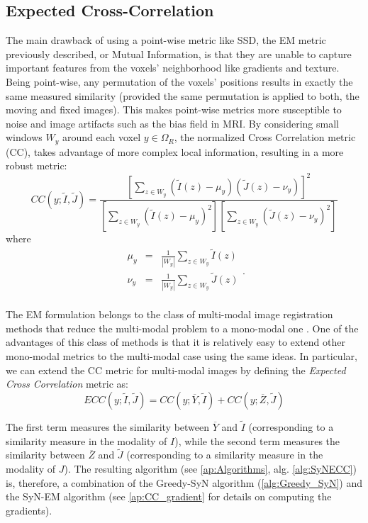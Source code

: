 \subsection{Expected Cross-Correlation}\label{sec:syn_ecc}
The main drawback of using a point-wise metric like SSD, the EM metric previously described, or Mutual Information, is that they are unable to capture important features from the voxels' neighborhood like gradients and texture. Being point-wise, any permutation of the voxels' positions results in exactly the same measured similarity (provided the same permutation is applied to both, the moving and fixed images). This makes point-wise metrics more susceptible to noise and image artifacts such as the bias field in MRI. By considering small windows $W_{y}$ around each voxel $y\in\Omega_{R}$, the normalized Cross Correlation metric (CC), takes advantage of more complex local information, resulting in a more robust metric:
\begin{equation}
    CC(y;\tilde{I}, \tilde{J}) = \frac{\left[\sum_{z\in W_{y}} \left(\tilde{I}(z) - \mu_{y}\right)\left(\tilde{J}(z) - \nu_{y}\right)\right]^{2}}
    {\left[\sum_{z \in W_{y}}\left(\tilde{I}(z) - \mu_{y}\right)^{2}\right] \left[\sum_{z \in W_{y}}\left(\tilde{J}(z) - \nu_{y}\right)^{2}\right]}
\end{equation}
where
\begin{equation}
    \begin{array}{lll}
        \mu_{y} &=& \frac{1}{|W_{y}|}\sum_{z \in W_{y}}\tilde{I}(z)\\
        \nu_{y} &=& \frac{1}{|W_{y}|}\sum_{z \in W_{y}}\tilde{J}(z)\\
    \end{array}.
\end{equation}

The EM formulation belongs to the class of multi-modal image registration methods that reduce the multi-modal problem to a mono-modal one \citep{Sotiras2013}. One of the advantages of this class of methods is that it is relatively easy to extend other mono-modal metrics to the multi-modal case using the same ideas. In particular, we can extend the CC metric for multi-modal images by defining the {\it Expected Cross Correlation} metric as:
\begin{equation}\label{eq:ecc_metric}
    ECC(y;\tilde{I}, \tilde{J}) = CC(y; \overline{Y}, \tilde{I}) + CC(y; \overline{Z}, \tilde{J})
\end{equation}

The first term measures the similarity between $\overline{Y}$ and $\tilde{I}$ (corresponding to a similarity measure in the modality of $I$), while the second term measures the
similarity between $\overline{Z}$ and $\tilde{J}$ (corresponding to a similarity measure in the modality of $J$). The resulting algorithm (see \ref{ap:Algorithms}, alg. \ref{alg:SyNECC}) is, therefore, a combination of the Greedy-SyN algorithm (\ref{alg:Greedy_SyN}) and the SyN-EM algorithm (see \ref{ap:CC_gradient} for details on
computing the gradients).


